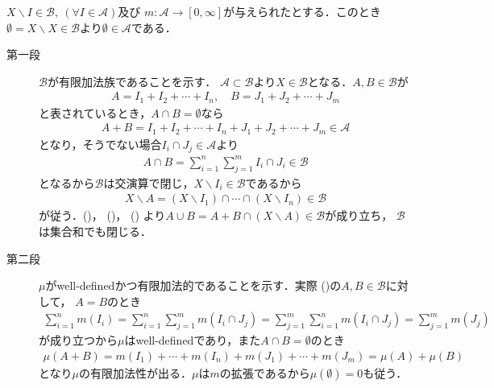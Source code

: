 		\begin{prf} $X \backslash I \in \mathcal{B},\ (\forall I \in \mathcal{A})$及び
			$m:\mathcal{A} \longrightarrow [0,\infty]$が与えられたとする．このとき
			$\emptyset = X \backslash X \in \mathcal{B}$より$\emptyset \in \mathcal{A}$である．
			\begin{description}
				\item[第一段]
					$\mathcal{B}$が有限加法族であることを示す．
					$\mathcal{A} \subset \mathcal{B}$より$X \in \mathcal{B}$となる．$A,B \in \mathcal{B}$が
					\begin{align}
						A = I_1 + I_2 + \cdots + I_n,
						\quad B = J_1 + J_2 + \cdots + J_m
						\label{eq:thm_forming_finitely_additive_class_4}
					\end{align}
					と表されているとき，$A \cap B = \emptyset$なら
					\begin{align}
						A + B = I_1 + I_2 + \cdots + I_n + J_1 + J_2 + \cdots + J_m \in \mathcal{A}
						\label{eq:thm_forming_finitely_additive_class_1}
					\end{align}
					となり，そうでない場合$I_i \cap J_j \in \mathcal{A}$より
					\begin{align}
						A \cap B = \sum_{i=1}^n\sum_{j=1}^m I_i \cap J_i \in \mathcal{B}
						\label{eq:thm_forming_finitely_additive_class_2}
					\end{align}
					となるから$\mathcal{B}$は交演算で閉じ，$X \backslash I_i \in \mathcal{B}$であるから
					\begin{align}
						X \backslash A = (X \backslash I_1) \cap \cdots \cap (X \backslash I_n) \in \mathcal{B}
						\label{eq:thm_forming_finitely_additive_class_3}
					\end{align}
					が従う．()，
					()，
					()
					より$A \cup B = A + B \cap (X \backslash A) \in \mathcal{B}$が成り立ち，
					$\mathcal{B}$は集合和でも閉じる．
		
				\item[第二段]
					$\mu$がwell-definedかつ有限加法的であることを示す．実際
					()の$A,B \in \mathcal{B}$に対して，
					$A = B$のとき
					\begin{align}
						\sum_{i=1}^n m(I_i)
						= \sum_{i=1}^n \sum_{j=1}^m m(I_i \cap J_j)
						= \sum_{j=1}^m \sum_{i=1}^n m(I_i \cap J_j)
						= \sum_{j=1}^m m(J_j)
					\end{align}
					が成り立つから$\mu$はwell-definedであり，また$A \cap B = \emptyset$のとき
					\begin{align}
						\mu(A + B)
						=  m(I_1) + \cdots + m(I_n) + m(J_1) + \cdots + m(J_m)
						= \mu(A) + \mu(B)
					\end{align}
					となり$\mu$の有限加法性が出る．$\mu$は$m$の拡張であるから$\mu(\emptyset) = 0$も従う．
					\QED
			\end{description}
		\end{prf}
		
